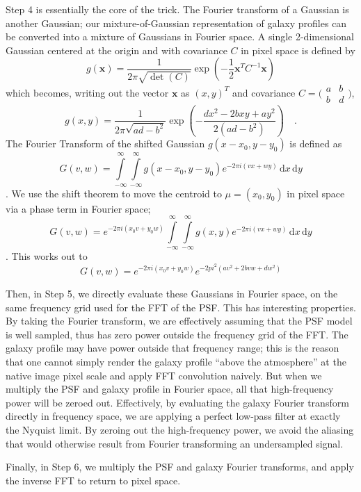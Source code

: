 \documentclass[11pt,preprint]{aastex}
\begin{document}
Step 4 is essentially the core of the trick.  The Fourier transform of
a Gaussian is another Gaussian; our mixture-of-Gaussian representation
of galaxy profiles can be converted into a mixture of Gaussians in
Fourier space.
%
A single 2-dimensional Gaussian
centered at the origin and
with covariance $C$
in pixel space is defined by
\[ g(\bm{x}) = \frac{1}{2 \pi \sqrt{\det(C)}} 
\exp\left( -\frac{1}{2} \bm{x}^T C^{-1} \bm{x} \right)
\]
which becomes, writing out the vector $\bm{x}$ as $(x,y)^T$
and covariance $C = \bigl(\begin{smallmatrix}
a&b \\ b&d
\end{smallmatrix} \bigr)$,
\[ g(x, y) = \frac{1}{2 \pi \sqrt{a d - b^2}}
\exp \left(
-\frac{d x^2 - 2 b x y + a y^2}{2(a d - b^2)}
\right) \quad .
\]
%
The Fourier Transform of the shifted Gaussian $g(x - x_0, y - y_0)$ is defined as
\[
G(v,w) = 
\int\limits_{-\infty}^{\infty}
\int\limits_{-\infty}^{\infty}
g(x - x_0, y - y_0) e^{-2 \pi i (v x + w y)} \, \mathrm{d}x \, \mathrm{d}y
\] \quad .
We use the shift theorem to move the centroid to $\mu = (x_0, y_0)$
in pixel space via a phase term in Fourier space;
\[
G(v, w) =
e^{-2 \pi i (x_0 v + y_0 w)}
\int\limits_{-\infty}^{\infty}
\int\limits_{-\infty}^{\infty}
g(x, y) e^{-2 \pi i (v x + w y)} \, \mathrm{d}x \, \mathrm{d}y
\] \quad .
%
This works out to
\[ G(v,w) = 
e^{-2 \pi i (x_0 v + y_0 w)}
e^{-2 pi^2 (a v^2 + 2 b v w + d w^2)}
\]

Then, in Step 5, we directly evaluate these Gaussians in Fourier
space, on the same frequency grid used for the FFT of the PSF.  This
has interesting properties.  By taking the Fourier transform, we are
effectively assuming that the PSF model is well sampled, thus has zero
power outside the frequency grid of the FFT.  The galaxy profile may
have power outside that frequency range; this is the reason that one
cannot simply render the galaxy profile ``above the atmosphere'' at
the native image pixel scale and apply FFT convolution naively.  But
when we multiply the PSF and galaxy profile in Fourier space, all that
high-frequency power will be zeroed out.  Effectively, by evaluating
the galaxy Fourier transform directly in frequency space, we are
applying a perfect low-pass filter at exactly the Nyquist limit.  By
zeroing out the high-frequency power, we avoid the aliasing that would
otherwise result from Fourier transforming an undersampled signal.
%

Finally, in Step 6, we multiply the PSF and galaxy Fourier transforms,
and apply the inverse FFT to return to pixel space.
\end{document}
